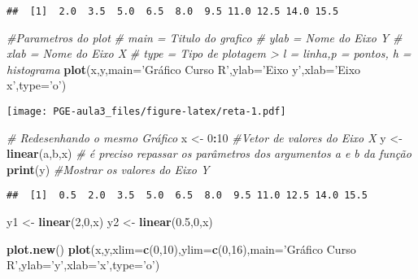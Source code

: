 \documentclass[]{article}
\newenvironment{Shaded}{\begin{snugshade}}{\end{snugshade}}
\newcommand{\KeywordTok}[1]{\textcolor[rgb]{0.13,0.29,0.53}{\textbf{#1}}}
\newcommand{\DataTypeTok}[1]{\textcolor[rgb]{0.13,0.29,0.53}{#1}}
\newcommand{\DecValTok}[1]{\textcolor[rgb]{0.00,0.00,0.81}{#1}}
\newcommand{\FloatTok}[1]{\textcolor[rgb]{0.00,0.00,0.81}{#1}}
\newcommand{\StringTok}[1]{\textcolor[rgb]{0.31,0.60,0.02}{#1}}
\newcommand{\CommentTok}[1]{\textcolor[rgb]{0.56,0.35,0.01}{\textit{#1}}}
\newcommand{\OperatorTok}[1]{\textcolor[rgb]{0.81,0.36,0.00}{\textbf{#1}}}
\newcommand{\NormalTok}[1]{#1}
\begin{document}
\begin{verbatim}
##  [1]  2.0  3.5  5.0  6.5  8.0  9.5 11.0 12.5 14.0 15.5
\end{verbatim}

\begin{Shaded}
\begin{Highlighting}[]
\CommentTok{#Parametros do plot}
\CommentTok{#     main = Titulo do grafico}
\CommentTok{#     ylab = Nome do Eixo Y}
\CommentTok{#     xlab = Nome do Eixo X}
\CommentTok{#     type = Tipo de plotagem > l = linha,p = pontos, h = histograma}
\KeywordTok{plot}\NormalTok{(x,y,}\DataTypeTok{main=}\StringTok{'Gráfico Curso R'}\NormalTok{,}\DataTypeTok{ylab=}\StringTok{'Eixo y'}\NormalTok{,}\DataTypeTok{xlab=}\StringTok{'Eixo x'}\NormalTok{,}\DataTypeTok{type=}\StringTok{'o'}\NormalTok{)}
\end{Highlighting}
\end{Shaded}

\texttt{[image: PGE-aula3\_files/figure-latex/reta-1.pdf]}

\begin{Shaded}
\begin{Highlighting}[]
\CommentTok{# Redesenhando o mesmo Gráfico}
\NormalTok{x <-}\StringTok{ }\DecValTok{0}\OperatorTok{:}\DecValTok{10} \CommentTok{#Vetor de valores do Eixo X}
\NormalTok{y <-}\StringTok{ }\KeywordTok{linear}\NormalTok{(a,b,x) }\CommentTok{# é preciso repassar os parâmetros dos argumentos a e b da função}
\KeywordTok{print}\NormalTok{(y) }\CommentTok{#Mostrar os valores do Eixo Y}
\end{Highlighting}
\end{Shaded}

\begin{verbatim}
##  [1]  0.5  2.0  3.5  5.0  6.5  8.0  9.5 11.0 12.5 14.0 15.5
\end{verbatim}

\begin{Shaded}
\begin{Highlighting}[]
\NormalTok{y1 <-}\StringTok{ }\KeywordTok{linear}\NormalTok{(}\DecValTok{2}\NormalTok{,}\DecValTok{0}\NormalTok{,x)}
\NormalTok{y2 <-}\StringTok{ }\KeywordTok{linear}\NormalTok{(}\FloatTok{0.5}\NormalTok{,}\DecValTok{0}\NormalTok{,x)}

\KeywordTok{plot.new}\NormalTok{()}
\KeywordTok{plot}\NormalTok{(x,y,}\DataTypeTok{xlim=}\KeywordTok{c}\NormalTok{(}\DecValTok{0}\NormalTok{,}\DecValTok{10}\NormalTok{),}\DataTypeTok{ylim=}\KeywordTok{c}\NormalTok{(}\DecValTok{0}\NormalTok{,}\DecValTok{16}\NormalTok{),}\DataTypeTok{main=}\StringTok{'Gráfico Curso R'}\NormalTok{,}\DataTypeTok{ylab=}\StringTok{'y'}\NormalTok{,}\DataTypeTok{xlab=}\StringTok{'x'}\NormalTok{,}\DataTypeTok{type=}\StringTok{'o'}\NormalTok{)}
\end{Highlighting}
\end{Shaded}
\end{document}

